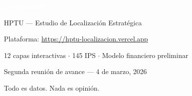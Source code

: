 \documentclass[aspectratio=169, 11pt]{beamer}
\begin{document}
{
\begin{frame}[plain]
\vfill
\begin{center}
{\Huge\bfseries\textcolor{white}{¿Preguntas?}}

\vspace{20pt}

\vspace{16pt}
{\large\textcolor{white!90}{HPTU — Estudio de Localización Estratégica}}

\vspace{10pt}
{\small\textcolor{white!70}{Plataforma: \url{https://hptu-localizacion.vercel.app}}}

\vspace{6pt}
{\small\textcolor{white!70}{12 capas interactivas $\cdot$ 145 IPS $\cdot$ Modelo financiero preliminar}}

\vspace{6pt}
{\small\textcolor{white!60}{Segunda reunión de avance — 4 de marzo, 2026}}

\vspace{20pt}
{\footnotesize\textcolor{white!40}{Todo es datos. Nada es opinión.}}
\end{center}
\vfill
\end{frame}
}
\end{document}
